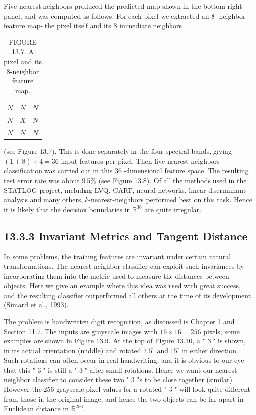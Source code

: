\documentclass[10pt]{article}
\begin{document}
Five-nearest-neighbors produced the predicted map shown in the bottom right panel, and was computed as follows. For each pixel we extracted an 8 -neighbor feature map- the pixel itself and its 8 immediate neighbors

\begin{table}[h]
\begin{center}
\begin{tabular}{|l|c|c|}
\hline
$N$ & $N$ & $N$ \\
\hline
$N$ & $X$ & $N$ \\
\hline
$N$ & $N$ & $N$ \\
\hline
\end{tabular}
\captionsetup{labelformat=empty}
\caption{FIGURE 13.7. A pixel and its 8-neighbor feature map.}
\end{center}
\end{table}

(see Figure 13.7). This is done separately in the four spectral bands, giving $(1+8) \times 4=36$ input features per pixel. Then five-nearest-neighbors classification was carried out in this 36 -dimensional feature space. The resulting test error rate was about $9.5 \%$ (see Figure 13.8). Of all the methods used in the STATLOG project, including LVQ, CART, neural networks, linear discriminant analysis and many others, $k$-nearest-neighbors performed best on this task. Hence it is likely that the decision boundaries in $\mathbb{R}^{36}$ are quite irregular.

\subsection*{13.3.3 Invariant Metrics and Tangent Distance}
In some problems, the training features are invariant under certain natural transformations. The nearest-neighbor classifier can exploit such invariances by incorporating them into the metric used to measure the distances between objects. Here we give an example where this idea was used with great success, and the resulting classifier outperformed all others at the time of its development (Simard et al., 1993).

The problem is handwritten digit recognition, as discussed is Chapter 1 and Section 11.7. The inputs are grayscale images with $16 \times 16=256$ pixels; some examples are shown in Figure 13.9. At the top of Figure 13.10, a " 3 " is shown, in its actual orientation (middle) and rotated $7.5^{\circ}$ and $15^{\circ}$ in either direction. Such rotations can often occur in real handwriting, and it is obvious to our eye that this " 3 " is still a " 3 " after small rotations. Hence we want our nearest-neighbor classifier to consider these two " 3 "s to be close together (similar). However the 256 grayscale pixel values for a rotated " 3 " will look quite different from those in the original image, and hence the two objects can be far apart in Euclidean distance in $\mathbb{R}^{256}$.
\end{document}
